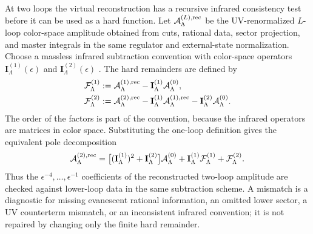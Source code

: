 \begin{controlledapproximation}
\label{ca:two-loop-ir-pole-consistency-gate}
At two loops the virtual reconstruction has a recursive infrared consistency
test before it can be used as a hard function.  Let
\(\mathcal A_\Lambda^{(L),{\rm rec}}\) be the UV-renormalized \(L\)-loop
color-space amplitude obtained from cuts, rational data, sector projection, and
master integrals in the same regulator and external-state normalization.
Choose a massless infrared subtraction convention with color-space operators
\(\mathbf I_\Lambda^{(1)}(\epsilon)\) and
\(\mathbf I_\Lambda^{(2)}(\epsilon)\)
\cite{Catani1998TwoLoopIR}.  The hard remainders are defined by
\begin{align}
  \mathcal F_\Lambda^{(1)}
  &:=
  \mathcal A_\Lambda^{(1),{\rm rec}}
  -
  \mathbf I_\Lambda^{(1)}\mathcal A_\Lambda^{(0)},\\
  \mathcal F_\Lambda^{(2)}
  &:=
  \mathcal A_\Lambda^{(2),{\rm rec}}
  -
  \mathbf I_\Lambda^{(1)}\mathcal A_\Lambda^{(1),{\rm rec}}
  -
  \mathbf I_\Lambda^{(2)}\mathcal A_\Lambda^{(0)} .
  \label{eq:two-loop-finite-remainder-recursive-definition}
\end{align}
The order of the factors is part of the convention, because the infrared
operators are matrices in color space.  Substituting the one-loop definition
gives the equivalent pole decomposition
\begin{equation}
  \mathcal A_\Lambda^{(2),{\rm rec}}
  =
  \bigl[(\mathbf I_\Lambda^{(1)})^2+\mathbf I_\Lambda^{(2)}\bigr]
  \mathcal A_\Lambda^{(0)}
  +
  \mathbf I_\Lambda^{(1)}\mathcal F_\Lambda^{(1)}
  +
  \mathcal F_\Lambda^{(2)} .
  \label{eq:two-loop-ir-pole-ledger}
\end{equation}
Thus the \(\epsilon^{-4},\ldots,\epsilon^{-1}\) coefficients of the reconstructed
two-loop amplitude are checked against lower-loop data in the same subtraction
scheme.  A mismatch is a diagnostic for missing evanescent rational information,
an omitted lower sector, a UV counterterm mismatch, or an inconsistent infrared
convention; it is not repaired by changing only the finite hard remainder.


\end{controlledapproximation}

